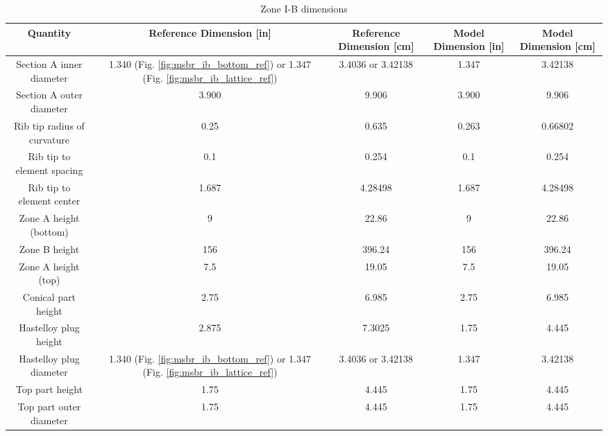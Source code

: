 \begin{table}[htpb]
    \centering
    \caption{Zone I-B dimensions}
    \begin{tabulary}{\linewidth}{|C|CC|CC|}
    \hline
    Quantity & Reference Dimension [in] & Reference Dimension [\unit{\centi\metre}] & Model Dimension [in] & Model Dimension [\unit{\centi\metre}]\\
    \hline
    Section A inner diameter & 1.340 (Fig. \ref{fig:msbr_ib_bottom_ref}) or 1.347 (Fig. \ref{fig:msbr_ib_lattice_ref}) & 3.4036 or 3.42138 & 1.347 & 3.42138 \\
    \hline
    Section A outer diameter & 3.900 & 9.906 & 3.900 & 9.906 \\
    \hline
    Rib tip radius of curvature & 0.25 & 0.635 & 0.263 & 0.66802\\
    \hline
    Rib tip to element spacing & 0.1 & 0.254 & 0.1 & 0.254\\
    \hline
    Rib tip to element center & 1.687 & 4.28498 & 1.687 & 4.28498\\
    \hline
    Zone A height (bottom) & 9 & 22.86 & 9 & 22.86\\
    \hline
    Zone B height & 156 & 396.24 & 156 & 396.24\\
    \hline
    Zone A height (top) & 7.5 & 19.05 & 7.5 & 19.05\\
    \hline
    Conical part height & 2.75 & 6.985 & 2.75 & 6.985\\
    \hline
    Hastelloy plug height & 2.875 & 7.3025 & 1.75 & 4.445 \\
    \hline
    Hastelloy plug diameter & 1.340 (Fig. \ref{fig:msbr_ib_bottom_ref}) or 1.347 (Fig. \ref{fig:msbr_ib_lattice_ref}) & 3.4036 or 3.42138 & 1.347 & 3.42138 \\
    \hline
    Top part height & 1.75 & 4.445 & 1.75 & 4.445 \\
    \hline
    Top part outer diameter & 1.75 & 4.445 & 1.75 & 4.445\\
    \hline
    \end{tabulary}
\end{table}


